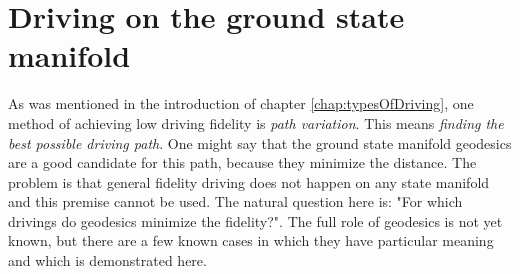 























\section{Driving on the ground state manifold}
\label{chap:groundStateManifoldDriving}
As was mentioned in the introduction of chapter \ref{chap:typesOfDriving}, one method of achieving low driving fidelity is \emph{path variation}. This means \emph{finding the best possible driving path}. One might say that the ground state manifold geodesics are a good candidate for this path, because they minimize the distance. The problem is that general fidelity driving does not happen on any state manifold and this premise cannot be used. The natural question here is: "For which drivings do geodesics minimize the fidelity?". The full role of geodesics is not yet known, but there are a few known cases in which they have particular meaning and which is demonstrated here.

